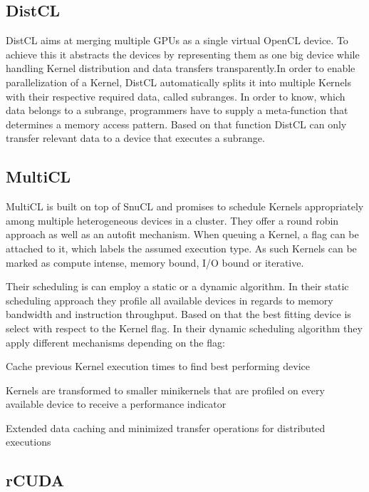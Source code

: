 \subsection*{DistCL}
DistCL aims at merging multiple GPUs as a single virtual OpenCL device\cite{distcl}. To achieve this it abstracts the devices by representing them as one big device while handling Kernel distribution and data transfers transparently.In order to enable parallelization of a Kernel, DistCL automatically splits it into multiple Kernels with their respective required data, called subranges. In order to know, which data belongs to a subrange, programmers have to supply a meta-function that determines a memory access pattern. Based on that function DistCL can only transfer relevant data to a device that executes a subrange.

\subsection*{MultiCL}

MultiCL is built on top of SnuCL and promises to schedule Kernels appropriately among multiple heterogeneous devices in a cluster\cite{multicl}. They offer a round robin approach as well as an autofit mechanism. When queuing a Kernel, a flag can be attached to it, which labels the assumed execution type. As such Kernels can be marked as compute intense, memory bound, I/O bound or iterative.

Their scheduling is can employ a static or a dynamic algorithm. In their static scheduling approach they profile all available devices in regards to memory bandwidth and instruction throughput. Based on that the best fitting device is select with respect to the Kernel flag. In their dynamic scheduling algorithm they apply different mechanisms depending on the flag:

\begin{description}[align=left,leftmargin=0cm]
\item [Iterative] Cache previous Kernel execution times to find best performing device
\item [Compute-Intensive] Kernels are transformed to smaller minikernels that are profiled on every available device to receive a performance indicator
\item [I/O-intensive] Extended data caching and minimized transfer operations for distributed executions
\end{description}

\subsection*{rCUDA}

